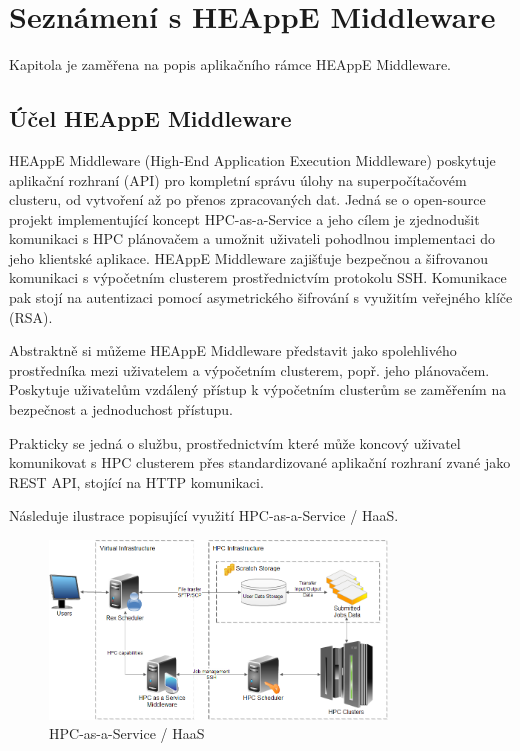\chapter{Seznámení s HEAppE Middleware}
Kapitola je zaměřena na popis aplikačního rámce HEAppE Middleware.

\section{Účel HEAppE Middleware}
HEAppE Middleware (High-End Application Execution Middleware) poskytuje aplikační rozhraní (API) pro kompletní správu úlohy na superpočítačovém clusteru, od vytvoření až po přenos zpracovaných dat. Jedná se o open-source projekt implementující koncept HPC-as-a-Service a jeho cílem je zjednodušit komunikaci s HPC plánovačem a umožnit uživateli pohodlnou implementaci do jeho klientské aplikace. HEAppE Middleware zajišťuje bezpečnou a šifrovanou komunikaci s výpočetním clusterem prostřednictvím protokolu SSH. Komunikace pak stojí na autentizaci pomocí asymetrického šifrování s využitím veřejného klíče (RSA).

Abstraktně si můžeme HEAppE Middleware představit jako spolehlivého prostředníka mezi uživatelem a výpočetním clusterem, popř. jeho plánovačem. Poskytuje uživatelům vzdálený přístup k výpočetním clusterům se zaměřením na bezpečnost a jednoduchost přístupu.

Prakticky se jedná o službu, prostřednictvím které může koncový uživatel komunikovat s HPC clusterem přes standardizované aplikační rozhraní zvané jako REST API, stojící na HTTP komunikaci.

Následuje ilustrace popisující využití HPC-as-a-Service / HaaS.

\begin{figure}
	\centering
	\includegraphics[width=0.8\textwidth]{Figures/haas.png}
	\caption{HPC-as-a-Service / HaaS \cite{uG7wIvjQiIli6kO9}}
	\label{fig:WritingThesis}
\end{figure}

